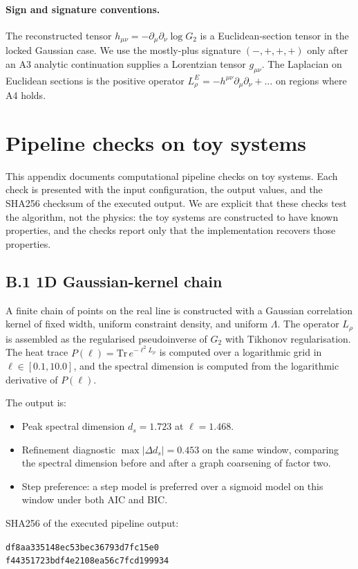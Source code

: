 ﻿\documentclass[12pt,a4paper]{article}
\theoremstyle{definition}
\begin{document}
\paragraph{Sign and signature conventions.} The reconstructed tensor $h_{\mu\nu} = -\partial_\mu\partial_\nu \log G_2$ is a Euclidean-section tensor in the locked Gaussian case. We use the mostly-plus signature $(-,+,+,+)$ only after an A3 analytic continuation supplies a Lorentzian tensor $g_{\mu\nu}$. The Laplacian on Euclidean sections is the positive operator $L_\rho^{E} = -h^{\mu\nu}\partial_\mu\partial_\nu + \ldots$ on regions where A4 holds.

\section{Pipeline checks on toy systems}
\label{app:pipeline}

This appendix documents computational pipeline checks on toy systems. Each check is presented with the input configuration, the output values, and the SHA256 checksum of the executed output. We are explicit that these checks test the algorithm, not the physics: the toy systems are constructed to have known properties, and the checks report only that the implementation recovers those properties.

\subsection{B.1 1D Gaussian-kernel chain}
\label{app:pipeline_chain}

A finite chain of points on the real line is constructed with a Gaussian correlation kernel of fixed width, uniform constraint density, and uniform $\Lambda$. The operator $L_\rho$ is assembled as the regularised pseudoinverse of $G_2$ with Tikhonov regularisation. The heat trace $P(\ell) = \mathrm{Tr}\,e^{-\ell^2 L_\rho}$ is computed over a logarithmic grid in $\ell \in [0.1,10.0]$, and the spectral dimension is computed from the logarithmic derivative of $P(\ell)$.

The output is:
\begin{itemize}
  \item Peak spectral dimension $d_s = 1.723$ at $\ell = 1.468$.
  \item Refinement diagnostic $\max|\Delta d_s| = 0.453$ on the same window, comparing the spectral dimension before and after a graph coarsening of factor two.
  \item Step preference: a step model is preferred over a sigmoid model on this window under both AIC and BIC.
\end{itemize}
SHA256 of the executed pipeline output:
\begin{center}
\texttt{df8aa335148ec53bec36793d7fc15e0}\\
\texttt{f44351723bdf4e2108ea56c7fcd199934}
\end{center}
\end{document}
